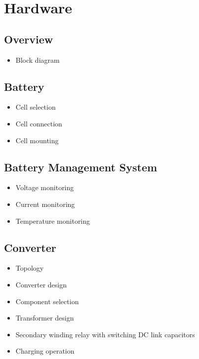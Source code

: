 \section{Hardware}

\FloatBarrier

\subsection{Overview}
\label{sec_hw_overview}
\begin{itemize}
    \item Block diagram
\end{itemize}

\FloatBarrier

\subsection{Battery}
\label{sec_battery}
\begin{itemize}
    \item Cell selection
    \item Cell connection
    \item Cell mounting
\end{itemize}

\subsection{Battery Management System}
\label{sec_bms}
\begin{itemize}
    \item Voltage monitoring
    \item Current monitoring
    \item Temperature monitoring
\end{itemize}

\FloatBarrier

\subsection{Converter}
\label{sec_converter}
\begin{itemize}
    \item Topology
    \item Converter design
    \item Component selection
    \item Transformer design
    \item Secondary winding relay with switching DC link capacitors
    \item Charging operation
\end{itemize}

